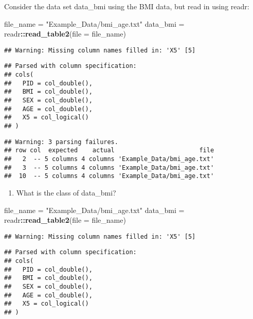 \documentclass[]{article}
\newenvironment{Shaded}{\begin{snugshade}}{\end{snugshade}}
\newcommand{\DataTypeTok}[1]{\textcolor[rgb]{0.13,0.29,0.53}{#1}}
\newcommand{\KeywordTok}[1]{\textcolor[rgb]{0.13,0.29,0.53}{\textbf{#1}}}
\newcommand{\NormalTok}[1]{#1}
\newcommand{\OperatorTok}[1]{\textcolor[rgb]{0.81,0.36,0.00}{\textbf{#1}}}
\newcommand{\StringTok}[1]{\textcolor[rgb]{0.31,0.60,0.02}{#1}}
\providecommand{\tightlist}{%
  \setlength{\itemsep}{0pt}\setlength{\parskip}{0pt}}
\begin{document}
Consider the data set data\_bmi using the BMI data, but read in using
readr:

\begin{Shaded}
\begin{Highlighting}[]
\NormalTok{file_name =}\StringTok{ "Example_Data/bmi_age.txt"}
\NormalTok{data_bmi =}\StringTok{ }\NormalTok{readr}\OperatorTok{::}\KeywordTok{read_table2}\NormalTok{(}\DataTypeTok{file =}\NormalTok{ file_name) }
\end{Highlighting}
\end{Shaded}

\begin{verbatim}
## Warning: Missing column names filled in: 'X5' [5]
\end{verbatim}

\begin{verbatim}
## Parsed with column specification:
## cols(
##   PID = col_double(),
##   BMI = col_double(),
##   SEX = col_double(),
##   AGE = col_double(),
##   X5 = col_logical()
## )
\end{verbatim}

\begin{verbatim}
## Warning: 3 parsing failures.
## row col  expected    actual                       file
##   2  -- 5 columns 4 columns 'Example_Data/bmi_age.txt'
##   3  -- 5 columns 4 columns 'Example_Data/bmi_age.txt'
##  10  -- 5 columns 4 columns 'Example_Data/bmi_age.txt'
\end{verbatim}

\begin{enumerate}
\def\labelenumi{\alph{enumi}.}
\tightlist
\item
  What is the class of data\_bmi?
\end{enumerate}

\begin{Shaded}
\begin{Highlighting}[]
\NormalTok{file_name =}\StringTok{ "Example_Data/bmi_age.txt"}
\NormalTok{data_bmi =}\StringTok{ }\NormalTok{readr}\OperatorTok{::}\KeywordTok{read_table2}\NormalTok{(}\DataTypeTok{file =}\NormalTok{ file_name)}
\end{Highlighting}
\end{Shaded}

\begin{verbatim}
## Warning: Missing column names filled in: 'X5' [5]
\end{verbatim}

\begin{verbatim}
## Parsed with column specification:
## cols(
##   PID = col_double(),
##   BMI = col_double(),
##   SEX = col_double(),
##   AGE = col_double(),
##   X5 = col_logical()
## )
\end{verbatim}
\end{document}
